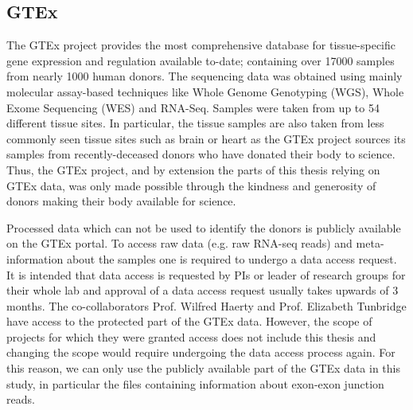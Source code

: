 


\subsection{GTEx} \label{subsec:gtex}
The GTEx project provides the most comprehensive database for tissue-specific gene expression and regulation available to-date; containing over 17000 samples from nearly 1000 human donors. The sequencing data was obtained using mainly molecular assay-based techniques like Whole Genome Genotyping (WGS), Whole Exome Sequencing (WES) and RNA-Seq. Samples were taken from up to 54 different tissue sites. In particular, the tissue samples are also taken from less commonly seen tissue sites such as brain or heart as the GTEx project sources its samples from recently-deceased donors who have donated their body to science. Thus, the GTEx project, and by extension the parts of this thesis relying on GTEx data, was only made possible through the kindness and generosity of donors making their body available for science.

Processed data which can not be used to identify the donors is publicly available on the GTEx portal. To access raw data (e.g. raw RNA-seq reads) and meta-information about the samples one is required to undergo a data access request. It is intended that data access is requested by PIs or leader of research groups for their whole lab and approval of a data access request usually takes upwards of 3 months. The co-collaborators Prof. Wilfred Haerty and Prof. Elizabeth Tunbridge have access to the protected part of the GTEx data. However, the scope of projects for which they were granted access does not include this thesis and changing the scope would require undergoing the data access process again. For this reason, we can only use the publicly available part of the GTEx data in this study, in particular the files containing information about exon-exon junction reads. 

